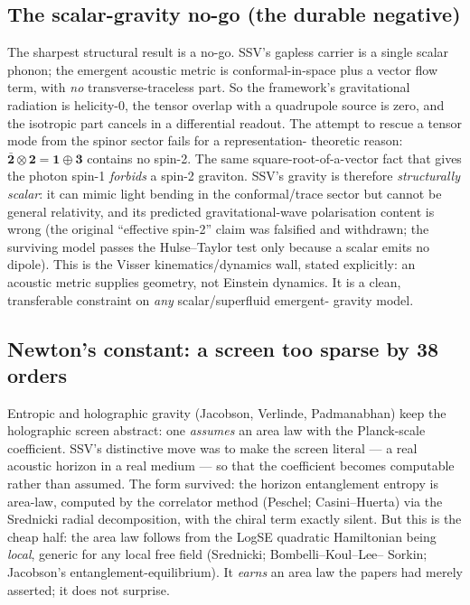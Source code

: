 \documentclass[11pt]{article}
\begin{document}
\subsection{The scalar-gravity no-go (the durable negative)}

The sharpest structural result is a no-go. SSV's gapless carrier is a single
scalar phonon; the emergent acoustic metric is conformal-in-space plus a vector
flow term, with \emph{no} transverse-traceless part. So the framework's
gravitational radiation is helicity-0, the tensor overlap with a quadrupole
source is zero, and the isotropic part cancels in a differential readout. The
attempt to rescue a tensor mode from the spinor sector fails for a representation-
theoretic reason: $\bar{\mathbf 2}\otimes\mathbf 2=\mathbf 1\oplus\mathbf 3$
contains no spin-2. The same square-root-of-a-vector fact that gives the photon
spin-1 \emph{forbids} a spin-2 graviton. SSV's gravity is therefore
\emph{structurally scalar}: it can mimic light bending in the conformal/trace
sector but cannot be general relativity, and its predicted gravitational-wave
polarisation content is wrong (the original ``effective spin-2'' claim was
falsified and withdrawn; the surviving model passes the Hulse--Taylor test only
because a scalar emits no dipole). This is the Visser kinematics/dynamics wall,
stated explicitly: an acoustic metric supplies geometry, not Einstein dynamics.
It is a clean, transferable constraint on \emph{any} scalar/superfluid emergent-
gravity model.

\subsection{Newton's constant: a screen too sparse by 38 orders}

Entropic and holographic gravity (Jacobson, Verlinde, Padmanabhan) keep the
holographic screen abstract: one \emph{assumes} an area law with the Planck-scale
coefficient. SSV's distinctive move was to make the screen literal --- a real
acoustic horizon in a real medium --- so that the coefficient becomes computable
rather than assumed. The form survived: the horizon entanglement entropy is
area-law, computed by the correlator method (Peschel; Casini--Huerta) via the
Srednicki radial decomposition, with the chiral term exactly silent. But this is
the cheap half: the area law follows from the LogSE quadratic Hamiltonian being
\emph{local}, generic for any local free field (Srednicki; Bombelli--Koul--Lee--
Sorkin; Jacobson's entanglement-equilibrium). It \emph{earns} an area law the
papers had merely asserted; it does not surprise.
\end{document}
